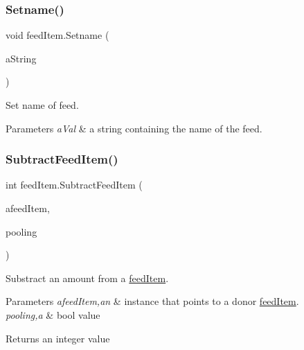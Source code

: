 \subsubsection{\texorpdfstring{Setname()}{Setname()}}
{\footnotesize\ttfamily void feed\+Item.\+Setname (\begin{DoxyParamCaption}\item[{string}]{a\+String }\end{DoxyParamCaption})\hspace{0.3cm}{\ttfamily [inline]}}



Set name of feed. 


\begin{DoxyParams}{Parameters}
{\em a\+Val} & a string containing the name of the feed. \\
\hline
\end{DoxyParams}
\mbox{\label{classfeed_item_a25b913edb05531ddef50ca8aa05e960d}} 
\subsubsection{\texorpdfstring{SubtractFeedItem()}{SubtractFeedItem()}}
{\footnotesize\ttfamily int feed\+Item.\+Subtract\+Feed\+Item (\begin{DoxyParamCaption}\item[{\mbox{\hyperlink{classfeed_item}{feed\+Item}}}]{afeed\+Item,  }\item[{bool}]{pooling }\end{DoxyParamCaption})\hspace{0.3cm}{\ttfamily [inline]}}



Substract an amount from a \mbox{\hyperlink{classfeed_item}{feed\+Item}}. 


\begin{DoxyParams}{Parameters}
{\em afeed\+Item,an} & instance that points to a donor \mbox{\hyperlink{classfeed_item}{feed\+Item}}. \\
\hline
{\em pooling,a} & bool value \\
\hline
\end{DoxyParams}
\begin{DoxyReturn}{Returns}
an integer value 
\end{DoxyReturn}
\mbox{\label{classfeed_item_a54c2b2dcc473131ba9ef87e66e716eac}} 
